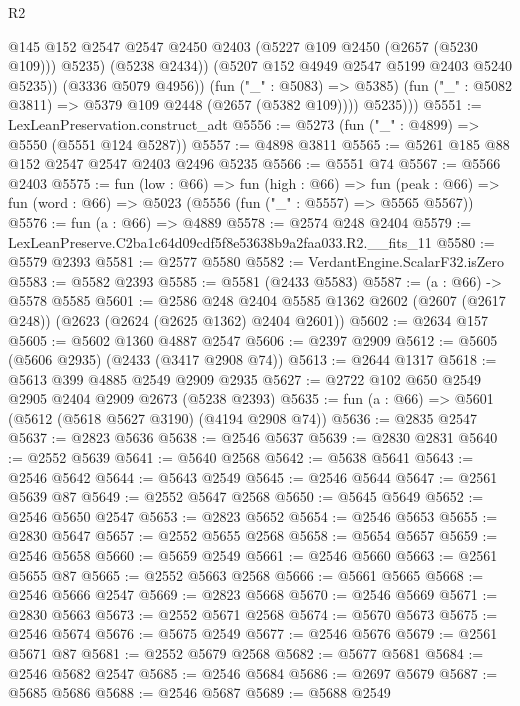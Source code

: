 \begin{lexlean}{R2}
\begin{coremodule}
                    @145
                    @152
                    @2547
                    @2547
                    @2450
                    @2403
                    (@5227 @109 @2450 (@2657 (@5230 @109)))
                    @5235)
                  (@5238 @2434))
                (@5207 @152 @4949 @2547 @5199 @2403 @5240 @5235))
              (@3336 @5079 @4956))
            (fun ("_" : @5083) => @5385)
            (fun ("_" : @5082 @3811) => @5379 @109 @2448 (@2657 (@5382 @109))))
          @5235)))
@5551 := LexLeanPreservation.construct_adt
@5556 := @5273 (fun ("_" : @4899) => @5550 (@5551 @124 @5287))
@5557 := @4898 @3811
@5565 := @5261 @185 @88 @152 @2547 @2547 @2403 @2496 @5235
@5566 := @5551 @74
@5567 := @5566 @2403
@5575 := fun (low : @66) =>
  fun (high : @66) =>
  fun (peak : @66) => fun (word : @66) => @5023 (@5556 (fun ("_" : @5557) => @5565 @5567))
@5576 := fun (a : @66) => @4889
@5578 := @2574 @248 @2404
@5579 := LexLeanPreserve.C2ba1c64d09cdf5f8e53638b9a2faa033.R2.__fits_11
@5580 := @5579 @2393
@5581 := @2577 @5580
@5582 := VerdantEngine.ScalarF32.isZero
@5583 := @5582 @2393
@5585 := @5581 (@2433 @5583)
@5587 := (a : @66) -> @5578 @5585
@5601 := @2586
    @248
    @2404
    @5585
    @1362
    @2602
    (@2607 (@2617 @248))
    (@2623 (@2624 (@2625 @1362) @2404 @2601))
@5602 := @2634 @157
@5605 := @5602 @1360 @4887 @2547
@5606 := @2397 @2909
@5612 := @5605 (@5606 @2935) (@2433 (@3417 @2908 @74))
@5613 := @2644 @1317
@5618 := @5613 @399 @4885 @2549 @2909 @2935
@5627 := @2722 @102 @650 @2549 @2905 @2404 @2909 @2673 (@5238 @2393)
@5635 := fun (a : @66) => @5601 (@5612 (@5618 @5627 @3190) (@4194 @2908 @74))
@5636 := @2835 @2547
@5637 := @2823 @5636
@5638 := @2546 @5637
@5639 := @2830 @2831
@5640 := @2552 @5639
@5641 := @5640 @2568
@5642 := @5638 @5641
@5643 := @2546 @5642
@5644 := @5643 @2549
@5645 := @2546 @5644
@5647 := @2561 @5639 @87
@5649 := @2552 @5647 @2568
@5650 := @5645 @5649
@5652 := @2546 @5650 @2547
@5653 := @2823 @5652
@5654 := @2546 @5653
@5655 := @2830 @5647
@5657 := @2552 @5655 @2568
@5658 := @5654 @5657
@5659 := @2546 @5658
@5660 := @5659 @2549
@5661 := @2546 @5660
@5663 := @2561 @5655 @87
@5665 := @2552 @5663 @2568
@5666 := @5661 @5665
@5668 := @2546 @5666 @2547
@5669 := @2823 @5668
@5670 := @2546 @5669
@5671 := @2830 @5663
@5673 := @2552 @5671 @2568
@5674 := @5670 @5673
@5675 := @2546 @5674
@5676 := @5675 @2549
@5677 := @2546 @5676
@5679 := @2561 @5671 @87
@5681 := @2552 @5679 @2568
@5682 := @5677 @5681
@5684 := @2546 @5682 @2547
@5685 := @2546 @5684
@5686 := @2697 @5679
@5687 := @5685 @5686
@5688 := @2546 @5687
@5689 := @5688 @2549

\end{coremodule}
\end{lexlean}
